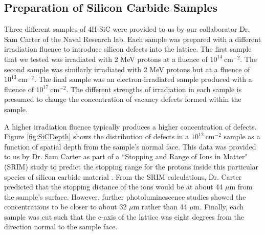 \documentclass[oneside, noacknowlegments]{BYUPhys}
\begin{document}
\subsection{Preparation of Silicon Carbide Samples}
\label{sec:SiCSamples}

Three different samples of 4H-SiC were provided to us by our collaborator Dr. Sam Carter of the Naval Research lab. Each sample was prepared with a different irradiation fluence to introduce silicon defects into the lattice. The first sample that we tested was irradiated with 2 MeV protons at a fluence of $10^{14}~\text{cm}^{-2}$. The second sample was similarly irradiated with 2 MeV protons but at a fluence of $10^{13}~\text{cm}^{-2}$. The final sample was an electron-irradiated sample produced with a fluence of $10^{17}~\text{cm}^{-2}$. The different strengths of irradiation in each sample is presumed to change the concentration of vacancy defects formed within the sample.

A higher irradiation fluence typically produces a higher concentration of defects. Figure \ref{fig:SiCDepth} shows the distribution of defects in a $10^{12}~\text{cm}^{-2}$ sample as a function of spatial depth from the sample's normal face. This data was provided to us by Dr. Sam Carter as part of a ``Stopping and Range of Ions in Matter" (SRIM) study to predict the stopping range for the protons inside this particular species of silicon carbide material \cite{RefWorks:doc:5892964ee4b0499fa95c5108}. From the SRIM calculations, Dr. Carter predicted that the stopping distance of the ions would be at about 44 $\mu$m from the sample's surface. However, further photoluminescence studies showed the concentrations to be closer to about 32 $\mu$m rather than 44 $\mu$m. Finally, each sample was cut such that the c-axis of the lattice was eight degrees from the direction normal to the sample face.
    
\end{document}
